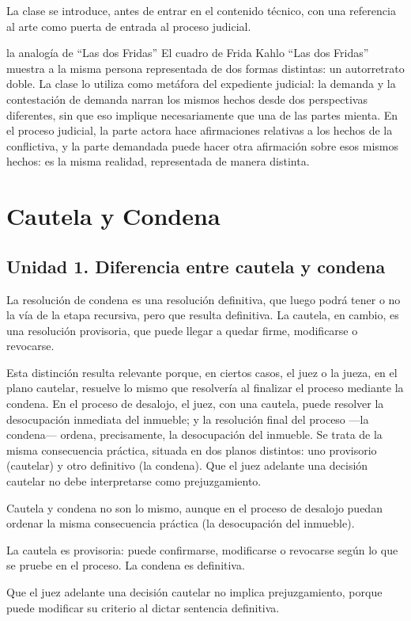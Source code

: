 \documentclass[12pt,oneside]{book}
\begin{document}
La clase se introduce, antes de entrar en el contenido técnico, con una referencia al arte como puerta de entrada al proceso judicial.

\begin{example}{la analogía de ``Las dos Fridas''}
El cuadro de Frida Kahlo ``Las dos Fridas'' muestra a la misma persona representada de dos formas distintas: un autorretrato doble. La clase lo utiliza como metáfora del expediente judicial: la demanda y la contestación de demanda narran los mismos hechos desde dos perspectivas diferentes, sin que eso implique necesariamente que una de las partes mienta. En el proceso judicial, la parte actora hace afirmaciones relativas a los hechos de la conflictiva, y la parte demandada puede hacer otra afirmación sobre esos mismos hechos: es la misma realidad, representada de manera distinta.
\end{example}

\chapter{Cautela y Condena}

\section{Unidad 1. Diferencia entre cautela y condena}

La resolución de condena es una resolución definitiva, que luego podrá tener o no la vía de la etapa recursiva, pero que resulta definitiva. La cautela, en cambio, es una resolución provisoria, que puede llegar a quedar firme, modificarse o revocarse.

Esta distinción resulta relevante porque, en ciertos casos, el juez o la jueza, en el plano cautelar, resuelve lo mismo que resolvería al finalizar el proceso mediante la condena. En el proceso de desalojo, el juez, con una cautela, puede resolver la desocupación inmediata del inmueble; y la resolución final del proceso ---la condena--- ordena, precisamente, la desocupación del inmueble. Se trata de la misma consecuencia práctica, situada en dos planos distintos: uno provisorio (cautelar) y otro definitivo (la condena). Que el juez adelante una decisión cautelar no debe interpretarse como prejuzgamiento.

\begin{important}
Cautela y condena no son lo mismo, aunque en el proceso de desalojo puedan ordenar la misma consecuencia práctica (la desocupación del inmueble).

La cautela es provisoria: puede confirmarse, modificarse o revocarse según lo que se pruebe en el proceso. La condena es definitiva.

Que el juez adelante una decisión cautelar no implica prejuzgamiento, porque puede modificar su criterio al dictar sentencia definitiva.
\end{important}
\end{document}
